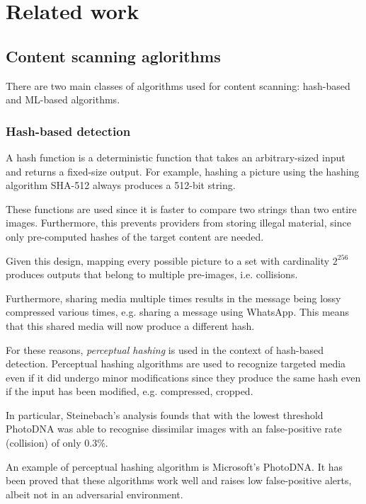 \section{Related work}

\subsection{Content scanning aglorithms}
\label{ss:det_algo}

There are two main classes of algorithms used for content scanning: hash-based and ML-based algorithms\cite{abelson2024bugs}. 

\subsubsection{Hash-based detection}

A hash function is a deterministic function that takes an arbitrary-sized input and returns a fixed-size output. For example, hashing a picture using the hashing algorithm SHA-512 always produces a 512-bit string. 

These functions are used since it is faster to compare two strings than two entire images. Furthermore, this prevents providers from storing illegal material, since only pre-computed hashes of the target content are needed\cite{abelson2024bugs}. 

Given this design, mapping every possible picture to a set with cardinality $2^{256}$ produces outputs that belong to multiple pre-images, i.e. collisions. 

Furthermore, sharing media multiple times results in the message being lossy compressed various times, e.g. sharing a message using WhatsApp. This means that this shared media will now produce a different hash. 

For these reasons, \textit{perceptual hashing} is used in the context of hash-based detection\cite{abelson2024bugs}. Perceptual hashing algorithms are used to recognize targeted media even if it did undergo minor modifications since they produce the same hash even if the input has been modified, e.g. compressed, cropped\cite{abelson2024bugs}.

In particular, Steinebach's analysis founds that with the lowest threshold PhotoDNA was able to recognise dissimilar images with an false-positive rate (collision) of only 0.3\%.

An example of perceptual hashing algorithm is Microsoft's PhotoDNA. It has been proved that these algorithms work well and raises low false-positive alerts\cite{steinebach2023analysis}, albeit not in an adversarial environment\cite{prokos2021squint}.

